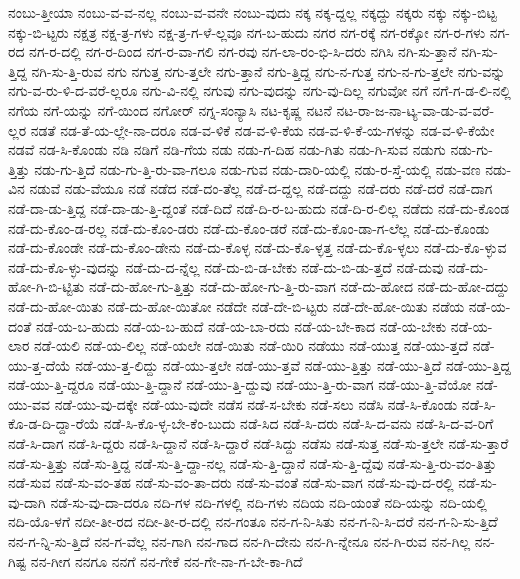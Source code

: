 {ನಂಬು-ತ್ತೀಯಾ
ನಂಬು-ವ-ವ-ನಲ್ಲ
ನಂಬು-ವ-ವನೇ
ನಂಬು-ವುದು
ನಕ್ಕ
ನಕ್ಕ-ದ್ದಲ್ಲ
ನಕ್ಕದ್ದು
ನಕ್ಕರು
ನಕ್ಕು
ನಕ್ಕು-ಬಿಟ್ಟ
ನಕ್ಕು-ಬಿ-ಟ್ಟರು
ನಕ್ಷತ್ರ
ನಕ್ಷ-ತ್ರ-ಗಳು
ನಕ್ಷ-ತ್ರ-ಗ-ಳೆ-ಲ್ಲವೂ
ನಗ-ಬ-ಹುದು
ನಗರ
ನಗ-ರಕ್ಕೆ
ನಗ-ರಕ್ಕೋ
ನಗ-ರ-ಗಳು
ನಗ-ರದ
ನಗ-ರ-ದಲ್ಲಿ
ನಗ-ರ-ದಿಂದ
ನಗ-ರ-ವಾ-ಗಲಿ
ನಗ-ರವು
ನಗ-ಲಾ-ರಂ-ಭಿ-ಸಿ-ದರು
ನಗಿಸಿ
ನಗಿ-ಸು-ತ್ತಾನೆ
ನಗಿ-ಸು-ತ್ತಿದ್ದ
ನಗಿ-ಸು-ತ್ತಿ-ರುವ
ನಗು
ನಗುತ್ತ
ನಗು-ತ್ತಲೇ
ನಗು-ತ್ತಾನೆ
ನಗು-ತ್ತಿದ್ದ
ನಗು-ನ-ಗುತ್ತ
ನಗು-ನ-ಗು-ತ್ತಲೇ
ನಗು-ವನ್ನು
ನಗು-ವ-ರು-ಳಿ-ದ-ವರೆ-ಲ್ಲರೂ
ನಗು-ವಿ-ನಲ್ಲಿ
ನಗುವು
ನಗು-ವುದನ್ನು
ನಗು-ವು-ದಿಲ್ಲ
ನಗುವೋ
ನಗೆ
ನಗೆ-ಗ-ಡ-ಲಿ-ನಲ್ಲಿ
ನಗೆಯ
ನಗೆ-ಯನ್ನು
ನಗೆ-ಯಿಂದ
ನಗೋರ್
ನಗ್ನ-ಸಂನ್ಯಾಸಿ
ನಟ-ಕೃಷ್ಣ
ನಟನೆ
ನಟ-ರಾ-ಜ-ನಾ-ಟ್ಯ-ವಾ-ಡು-ವ-ವರೆ-ಲ್ಲರ
ನಡತೆ
ನಡ-ತೆ-ಯ-ಲ್ಲೇ-ನಾ-ದರೂ
ನಡ-ವ-ಳಿಕೆ
ನಡ-ವ-ಳಿ-ಕೆಯ
ನಡ-ವ-ಳಿ-ಕೆ-ಯ-ಗಳನ್ನು
ನಡ-ವ-ಳಿ-ಕೆಯೇ
ನಡವೆ
ನಡ-ಸಿ-ಕೊಂಡು
ನಡಿ
ನಡಿಗೆ
ನಡಿ-ಗೆಯ
ನಡು
ನಡು-ಗ-ದಿಹ
ನಡು-ಗಿತು
ನಡು-ಗಿ-ಸುವ
ನಡುಗು
ನಡು-ಗು-ತ್ತಿತ್ತು
ನಡು-ಗು-ತ್ತಿದೆ
ನಡು-ಗು-ತ್ತಿ-ರು-ವಾ-ಗಲೂ
ನಡು-ಗುವ
ನಡು-ದಾರಿ-ಯಲ್ಲಿ
ನಡು-ರ-ಸ್ತೆ-ಯಲ್ಲಿ
ನಡು-ವಣ
ನಡು-ವಿನ
ನಡುವೆ
ನಡು-ವೆಯೂ
ನಡೆ
ನಡೆದ
ನಡೆ-ದಂ-ತೆಲ್ಲ
ನಡೆ-ದ-ದ್ದಲ್ಲ
ನಡೆ-ದದ್ದು
ನಡೆ-ದರು
ನಡೆ-ದರೆ
ನಡೆ-ದಾಗ
ನಡೆ-ದಾ-ಡು-ತ್ತಿದ್ದ
ನಡೆ-ದಾ-ಡು-ತ್ತಿ-ದ್ದಂತೆ
ನಡೆ-ದಿದೆ
ನಡೆ-ದಿ-ರ-ಬ-ಹುದು
ನಡೆ-ದಿ-ರ-ಲಿಲ್ಲ
ನಡೆದು
ನಡೆ-ದು-ಕೊಂಡ
ನಡೆ-ದು-ಕೊಂ-ಡ-ರಲ್ಲ
ನಡೆ-ದು-ಕೊಂ-ಡರು
ನಡೆ-ದು-ಕೊಂ-ಡರೆ
ನಡೆ-ದು-ಕೊಂ-ಡಾ-ಗ-ಲೆಲ್ಲ
ನಡೆ-ದು-ಕೊಂಡು
ನಡೆ-ದು-ಕೊಂಡೇ
ನಡೆ-ದು-ಕೊಂ-ಡೇನು
ನಡೆ-ದು-ಕೊಳ್ಳ
ನಡೆ-ದು-ಕೊ-ಳ್ಳತ್ತ
ನಡೆ-ದು-ಕೊ-ಳ್ಳಲು
ನಡೆ-ದು-ಕೊ-ಳ್ಳುವ
ನಡೆ-ದು-ಕೊ-ಳ್ಳು-ವುದನ್ನು
ನಡೆ-ದು-ದ-ನ್ನೆಲ್ಲ
ನಡೆ-ದು-ಬಿ-ಡ-ಬೇಕು
ನಡೆ-ದು-ಬಿ-ಡು-ತ್ತದೆ
ನಡೆ-ದುವು
ನಡೆ-ದು-ಹೋ-ಗಿ-ಬಿ-ಟ್ಟಿತು
ನಡೆ-ದು-ಹೋ-ಗು-ತ್ತಿತ್ತು
ನಡೆ-ದು-ಹೋ-ಗು-ತ್ತಿ-ರು-ವಾಗ
ನಡೆ-ದು-ಹೋದ
ನಡೆ-ದು-ಹೋ-ದದ್ದು
ನಡೆ-ದು-ಹೋ-ಯಿತು
ನಡೆ-ದು-ಹೋ-ಯಿತೋ
ನಡೆದೇ
ನಡೆ-ದೇ-ಬಿ-ಟ್ಟರು
ನಡೆ-ದೇ-ಹೋ-ಯಿತು
ನಡೆಯ
ನಡೆ-ಯ-ದಂತೆ
ನಡೆ-ಯ-ಬ-ಹುದು
ನಡೆ-ಯ-ಬ-ಹುದೆ
ನಡೆ-ಯ-ಬಾ-ರದು
ನಡೆ-ಯ-ಬೇ-ಕಾದ
ನಡೆ-ಯ-ಬೇಕು
ನಡೆ-ಯ-ಲಾರ
ನಡೆ-ಯಲಿ
ನಡೆ-ಯ-ಲಿಲ್ಲ
ನಡೆ-ಯಲೇ
ನಡೆ-ಯಿತು
ನಡೆ-ಯಿರಿ
ನಡೆಯು
ನಡೆ-ಯುತ್ತ
ನಡೆ-ಯು-ತ್ತದೆ
ನಡೆ-ಯು-ತ್ತ-ದೆಯೆ
ನಡೆ-ಯು-ತ್ತ-ಲಿದ್ದು
ನಡೆ-ಯು-ತ್ತಲೇ
ನಡೆ-ಯು-ತ್ತವೆ
ನಡೆ-ಯು-ತ್ತಿತ್ತು
ನಡೆ-ಯು-ತ್ತಿದೆ
ನಡೆ-ಯು-ತ್ತಿದ್ದ
ನಡೆ-ಯು-ತ್ತಿ-ದ್ದರೂ
ನಡೆ-ಯು-ತ್ತಿ-ದ್ದಾನೆ
ನಡೆ-ಯು-ತ್ತಿ-ದ್ದುವು
ನಡೆ-ಯು-ತ್ತಿ-ರು-ವಾಗ
ನಡೆ-ಯು-ತ್ತಿ-ವೆಯೋ
ನಡೆ-ಯು-ವವ
ನಡೆ-ಯು-ವು-ದಕ್ಕೇ
ನಡೆ-ಯು-ವುದೇ
ನಡೆಸ
ನಡೆ-ಸ-ಬೇಕು
ನಡೆ-ಸಲು
ನಡೆಸಿ
ನಡೆ-ಸಿ-ಕೊಂಡು
ನಡೆ-ಸಿ-ಕೊ-ಡ-ದಿ-ದ್ದಾ-ರೆಯೆ
ನಡೆ-ಸಿ-ಕೊ-ಳ್ಳ-ಬೇ-ಕೆಂ-ಬುದು
ನಡೆ-ಸಿದ
ನಡೆ-ಸಿ-ದರು
ನಡೆ-ಸಿ-ದ-ವನು
ನಡೆ-ಸಿ-ದ-ವ-ರಿಗೆ
ನಡೆ-ಸಿ-ದಾಗ
ನಡೆ-ಸಿ-ದ್ದರು
ನಡೆ-ಸಿ-ದ್ದಾನೆ
ನಡೆ-ಸಿ-ದ್ದಾರೆ
ನಡೆ-ಸಿದ್ದು
ನಡೆಸು
ನಡೆ-ಸುತ್ತ
ನಡೆ-ಸು-ತ್ತಲೇ
ನಡೆ-ಸು-ತ್ತಾರೆ
ನಡೆ-ಸು-ತ್ತಿತ್ತು
ನಡೆ-ಸು-ತ್ತಿದ್ದ
ನಡೆ-ಸು-ತ್ತಿ-ದ್ದಾ-ನಲ್ಲ
ನಡೆ-ಸು-ತ್ತಿ-ದ್ದಾನೆ
ನಡೆ-ಸು-ತ್ತಿ-ದ್ದೆವು
ನಡೆ-ಸು-ತ್ತಿ-ರು-ವಂ-ತಿತ್ತು
ನಡೆ-ಸುವ
ನಡೆ-ಸು-ವಂ-ತಹ
ನಡೆ-ಸು-ವಂ-ತಾ-ದರು
ನಡೆ-ಸು-ವಂತೆ
ನಡೆ-ಸು-ವಾಗ
ನಡೆ-ಸು-ವು-ದ-ರಲ್ಲಿ
ನಡೆ-ಸು-ವು-ದಾಗಿ
ನಡೆ-ಸು-ವು-ದಾ-ದರೂ
ನದಿ-ಗಳ
ನದಿ-ಗಳಲ್ಲಿ
ನದಿ-ಗಳು
ನದಿಯ
ನದಿ-ಯಂತೆ
ನದಿ-ಯನ್ನು
ನದಿ-ಯಲ್ಲಿ
ನದಿ-ಯೊ-ಳಗೆ
ನದೀ-ತೀ-ರದ
ನದೀ-ತೀ-ರ-ದಲ್ಲಿ
ನನ-ಗಂತೂ
ನನ-ಗ-ನಿ-ಸಿತು
ನನ-ಗ-ನಿ-ಸಿ-ದರೆ
ನನ-ಗ-ನಿ-ಸು-ತ್ತಿದೆ
ನನ-ಗ-ನ್ನಿ-ಸು-ತ್ತಿದೆ
ನನ-ಗ-ವೆಲ್ಲ
ನನ-ಗಾಗಿ
ನನ-ಗಾದ
ನನ-ಗಿ-ದೇನು
ನನ-ಗಿ-ನ್ನೇನೂ
ನನ-ಗಿ-ರುವ
ನನ-ಗಿಲ್ಲ
ನನ-ಗಿಷ್ಟ
ನನ-ಗೀಗ
ನನಗೂ
ನನಗೆ
ನನ-ಗೇಕೆ
ನನ-ಗೇ-ನಾ-ಗ-ಬೇ-ಕಾ-ಗಿದೆ
}
